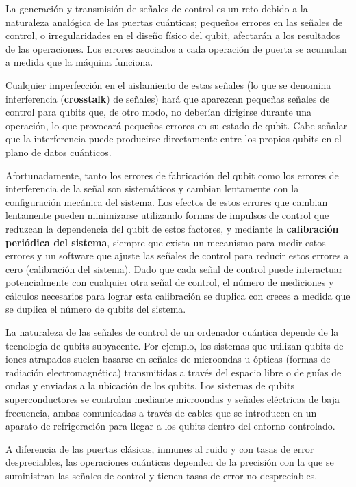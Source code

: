 La generación y transmisión de señales de control es un reto debido a la naturaleza analógica de las puertas cuánticas; pequeños errores en las señales de control, o irregularidades en el diseño físico del qubit, afectarán a los resultados de las operaciones. Los errores asociados a cada operación de puerta se acumulan a medida que la máquina funciona. 

Cualquier imperfección en el aislamiento de estas señales (lo que se denomina interferencia (\textbf{crosstalk}) de señales) hará que aparezcan pequeñas señales de control para qubits que, de otro modo, no deberían dirigirse durante una operación, lo que provocará pequeños errores en su estado de qubit. Cabe señalar que la interferencia puede producirse directamente entre los propios qubits en el plano de datos cuánticos.

Afortunadamente, tanto los errores de fabricación del qubit como los errores de interferencia de la señal son sistemáticos y cambian lentamente con la configuración mecánica del sistema. Los efectos de estos errores que cambian lentamente pueden minimizarse utilizando formas de impulsos de control que reduzcan la dependencia del qubit de estos factores, y mediante la \textbf{calibración periódica del sistema}, siempre que exista un mecanismo para medir estos errores y un software que ajuste las señales de control para reducir estos errores a cero (calibración del sistema). Dado que cada señal de control puede interactuar potencialmente con cualquier otra señal de control, el número de mediciones y cálculos necesarios para lograr esta calibración se duplica con creces a medida que se duplica el número de qubits del sistema.

La naturaleza de las señales de control de un ordenador cuántica depende de la tecnología de qubits subyacente. Por ejemplo, los sistemas que utilizan qubits de iones atrapados suelen basarse en señales de microondas u ópticas (formas de radiación electromagnética) transmitidas a través del espacio libre o de guías de ondas y enviadas a la ubicación de los qubits. Los sistemas de qubits superconductores se controlan mediante microondas y señales eléctricas de baja frecuencia, ambas comunicadas a través de cables que se introducen en un aparato de refrigeración para llegar a los qubits dentro del entorno controlado.

A diferencia de las puertas clásicas, inmunes al ruido y con tasas de error despreciables, las operaciones cuánticas dependen de la precisión con la que se suministran las señales de control y tienen tasas de error no despreciables. 


